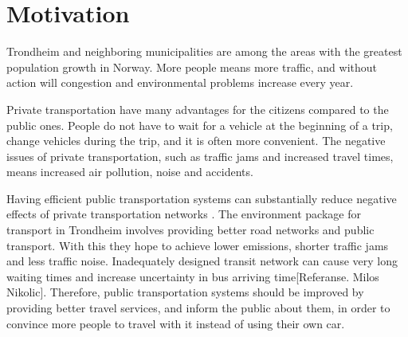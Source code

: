 \section{Motivation}

Trondheim and neighboring municipalities are among the areas with the greatest population growth in Norway. \citep{website:miljopakken} More people means more traffic, and without action will congestion and environmental problems increase every year. 

Private transportation have many advantages for the citizens compared to the public ones. People do not have to wait for a vehicle at the beginning of a trip, change vehicles during the trip, and it is often more convenient. The negative issues of private transportation, such as traffic jams and increased travel times, means increased air pollution, noise and accidents. 

Having efficient public transportation systems can substantially reduce negative effects of private transportation networks 
\citep{kechagiopoulos13} . The environment package \citep{website:miljopakken} for transport in Trondheim involves providing better road networks and public transport. With this they hope to achieve lower emissions, shorter traffic jams and less traffic noise. Inadequately designed transit network can cause very long waiting times and increase uncertainty in bus arriving time[Referanse. Milos Nikolic]. Therefore, public transportation systems should be improved by providing better travel services, and inform the public about them, in order to convince more people to travel with it instead of using their own car. 

